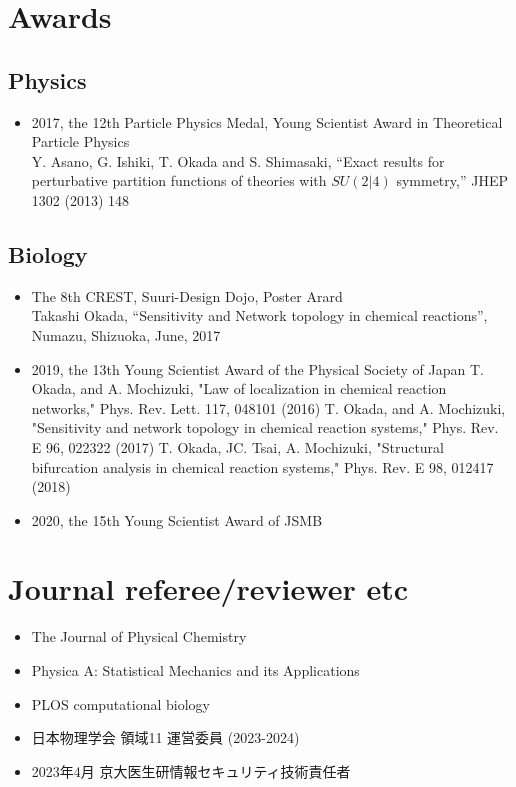 \documentclass[letterpaper,12pt]{article}
\begin{document}

 \section*{{\bf  Awards}}
 \subsection*{Physics}
\begin{itemize}
\item
2017, the 12th Particle Physics Medal, Young Scientist Award in Theoretical Particle Physics\\
Y. Asano, G. Ishiki, T. Okada and S. Shimasaki, “Exact results for perturbative partition functions of theories with $S U (2|4)$ symmetry,” JHEP 1302 (2013) 148
\end{itemize}
\subsection*{Biology}
\begin{itemize}
\item

The 8th CREST, Suuri-Design Dojo, Poster Arard\\
Takashi Okada, ``Sensitivity and Network topology in chemical reactions'', Numazu, Shizuoka,  June, 2017
\item
2019, the 13th Young Scientist Award of the Physical Society of Japan
T. Okada, and A. Mochizuki, "Law of localization in chemical reaction networks," Phys. Rev. Lett. 117, 048101 (2016)
T. Okada, and A. Mochizuki, "Sensitivity and network topology in chemical reaction systems," Phys. Rev. E 96, 022322 (2017)
T. Okada, JC. Tsai, A. Mochizuki, "Structural bifurcation analysis in chemical reaction systems," Phys. Rev. E 98, 012417 (2018)
\item
2020, the 15th Young Scientist Award of JSMB

\end{itemize}

 \section*{{\bf  Journal referee/reviewer etc}}
\begin{itemize}
\item The Journal of Physical Chemistry
\item Physica A: Statistical Mechanics and its Applications
\item PLOS computational biology
\item 日本物理学会 領域11 運営委員 (2023-2024)

\item 2023年4月 京大医生研情報セキュリティ技術責任者
\end{itemize}
\end{document}
